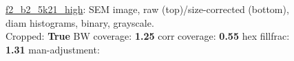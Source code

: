 \begin{figure}[h!]
\label{semimg33}
\caption*{\hyperlink{covtableaug_13_12}{\color{blue} \small \ttfamily f2\_b2\_5k21\_high}: SEM image, raw (top)/size-corrected (bottom), diam histograms, binary, grayscale.\\Cropped: {\bf True} \;\; BW coverage: {\bf 1.25} \:\: corr coverage: {\bf 0.55} \:\: hex fillfrac: {\bf 1.31} \:\: man-adjustment: {\bf \color{blue}{Yes}}}
\end{figure}
\newpage

